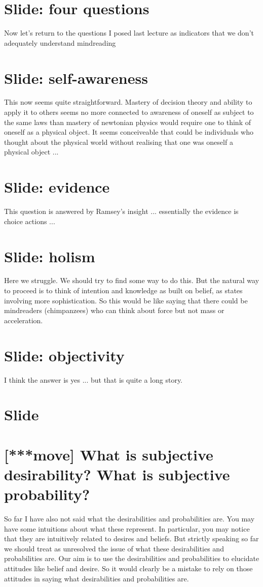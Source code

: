 \documentclass[12pt,\papersize]{extarticle}
\begin{document}
\section{Slide: four questions}
Now let’s return to the questions I posed last lecture as indicators that we don’t adequately understand mindreading


\section{Slide: self-awareness}
This now seems quite straightforward.  Mastery of decision theory and ability to apply it to others seems no more connected to awareness of oneself as subject to the same laws than mastery of newtonian physics would require one to think of oneself as a physical object.  It seems conceiveable that could be individuals who thought about the physical world without realising that one was oneself a physical object ...


\section{Slide: evidence}
This question is answered by Ramsey’s insight ... essentially the evidence is choice actions ...


\section{Slide: holism}
Here we struggle.  We should try to find some way to do this.  But the natural way to proceed is to think of intention and knowledge as built on belief, as states involving more sophistication.  So this would be like saying that there could be mindreaders (chimpanzees) who can think about force but not mass or acceleration.


\section{Slide: objectivity}
I think the answer is yes ... but that is quite a long story.


\section{Slide}



\section{[***move] What is subjective desirability?  What is subjective probability?}
So far I have also not said what the desirabilities and probabilities are.
You may have some intuitions about what these represent.
In particular,  you may notice that they are intuitively related to desires and beliefs.
But strictly speaking so far we should treat as unresolved the issue of what these desirabilities and probabilities are.
Our aim is to use the desirabilities and probabilities to elucidate attitudes like belief and desire.
So it would clearly be a mistake to rely on those attitudes in saying what desirabilities and probabilities are.
\end{document}
